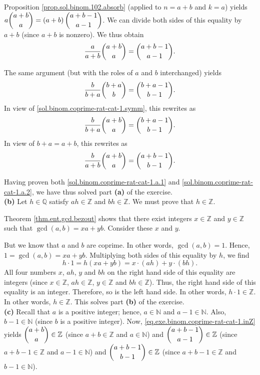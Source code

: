 \documentclass[paper=a4, fontsize=12pt]{scrartcl}%
\theoremstyle{plainsl}
\theoremstyle{definition}
\theoremstyle{remark}
\begin{document}
Proposition \ref{prop.sol.binom.102.absorb} (applied to $n=a+b$ and $k=a$)
yields $a\dbinom{a+b}{a}=\left(  a+b\right)  \dbinom{a+b-1}{a-1}$. We can
divide both sides of this equality by $a+b$ (since $a+b$ is nonzero). We thus
obtain
\begin{equation}
\dfrac{a}{a+b}\dbinom{a+b}{a}=\dbinom{a+b-1}{a-1}.
\label{sol.binom.coprime-rat-cat-1.a.1}%
\end{equation}


The same argument (but with the roles of $a$ and $b$ interchanged) yields%
\[
\dfrac{b}{b+a}\dbinom{b+a}{b}=\dbinom{b+a-1}{b-1}.
\]
In view of \eqref{sol.binom.coprime-rat-cat-1.symm}, this rewrites as%
\[
\dfrac{b}{b+a}\dbinom{a+b}{a}=\dbinom{b+a-1}{b-1}.
\]
In view of $b+a=a+b$, this rewrites as%
\begin{equation}
\dfrac{b}{a+b}\dbinom{a+b}{a}=\dbinom{a+b-1}{b-1}.
\label{sol.binom.coprime-rat-cat-1.a.2}%
\end{equation}


Having proven both \eqref{sol.binom.coprime-rat-cat-1.a.1} and
\eqref{sol.binom.coprime-rat-cat-1.a.2}, we have thus solved part \textbf{(a)}
of the exercise. \\[0.4cm]

\textbf{(b)} Let $h\in\mathbb{Q}$ satisfy $ah\in\mathbb{Z}$ and $bh\in
\mathbb{Z}$. We must prove that $h\in\mathbb{Z}$.

Theorem \ref{thm.ent.gcd.bezout} shows that there exist integers
$x\in\mathbb{Z}$ and $y\in\mathbb{Z}$ such that $\gcd\left(  a,b\right)
=xa+yb$. Consider these $x$ and $y$.

But we know that $a$ and $b$ are coprime. In other words, $\gcd\left(
a,b\right)  =1$. Hence, $1=\gcd\left(  a,b\right)  =xa+yb$. Multiplying both
sides of this equality by $h$, we find%
\[
h\cdot1=h\left(  xa+yb\right)  =x\cdot\left(  ah\right)  +y\cdot\left(
bh\right)  .
\]
All four numbers $x$, $ah$, $y$ and $bh$ on the right hand side of this
equality are integers (since $x\in\mathbb{Z}$, $ah\in\mathbb{Z}$,
$y\in\mathbb{Z}$ and $bh\in\mathbb{Z}$). Thus, the right hand side of this
equality is an integer. Therefore, so is the left hand side. In other words,
$h\cdot1\in\mathbb{Z}$. In other words, $h\in\mathbb{Z}$. This solves part
\textbf{(b)} of the exercise. \\[0.4cm]

\textbf{(c)} Recall that $a$ is a positive integer; hence, $a\in\mathbb{N}$
and $a-1\in\mathbb{N}$. Also, $b-1\in\mathbb{N}$ (since $b$ is a positive
integer). Now, \eqref{eq.exe.binom.coprime-rat-cat-1.inZ} yields $\dbinom
{a+b}{a}\in\mathbb{Z}$ (since $a+b\in\mathbb{Z}$ and $a\in\mathbb{N}$) and
$\dbinom{a+b-1}{a-1}\in\mathbb{Z}$ (since $a+b-1\in\mathbb{Z}$ and
$a-1\in\mathbb{N}$) and $\dbinom{a+b-1}{b-1}\in\mathbb{Z}$ (since
$a+b-1\in\mathbb{Z}$ and $b-1\in\mathbb{N}$).
\end{document}
